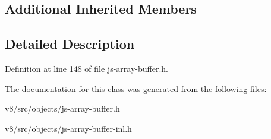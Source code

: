 \subsection*{Additional Inherited Members}


\subsection{Detailed Description}


Definition at line 148 of file js-\/array-\/buffer.\+h.



The documentation for this class was generated from the following files\+:\begin{DoxyCompactItemize}
\item 
v8/src/objects/js-\/array-\/buffer.\+h\item 
v8/src/objects/js-\/array-\/buffer-\/inl.\+h\end{DoxyCompactItemize}
